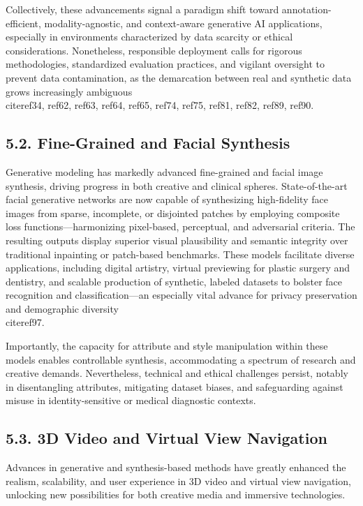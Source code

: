 \documentclass[11pt]{article}
\begin{document}
Collectively, these advancements signal a paradigm shift toward annotation-efficient, modality-agnostic, and context-aware generative AI applications, especially in environments characterized by data scarcity or ethical considerations. Nonetheless, responsible deployment calls for rigorous methodologies, standardized evaluation practices, and vigilant oversight to prevent data contamination, as the demarcation between real and synthetic data grows increasingly ambiguous~\\cite{ref34, ref62, ref63, ref64, ref65, ref74, ref75, ref81, ref82, ref89, ref90}.

\subsection{5.2. Fine-Grained and Facial Synthesis}

Generative modeling has markedly advanced fine-grained and facial image synthesis, driving progress in both creative and clinical spheres. State-of-the-art facial generative networks are now capable of synthesizing high-fidelity face images from sparse, incomplete, or disjointed patches by employing composite loss functions—harmonizing pixel-based, perceptual, and adversarial criteria. The resulting outputs display superior visual plausibility and semantic integrity over traditional inpainting or patch-based benchmarks. These models facilitate diverse applications, including digital artistry, virtual previewing for plastic surgery and dentistry, and scalable production of synthetic, labeled datasets to bolster face recognition and classification—an especially vital advance for privacy preservation and demographic diversity~\\cite{ref97}.

Importantly, the capacity for attribute and style manipulation within these models enables controllable synthesis, accommodating a spectrum of research and creative demands. Nevertheless, technical and ethical challenges persist, notably in disentangling attributes, mitigating dataset biases, and safeguarding against misuse in identity-sensitive or medical diagnostic contexts.

\subsection{5.3. 3D Video and Virtual View Navigation}

Advances in generative and synthesis-based methods have greatly enhanced the realism, scalability, and user experience in 3D video and virtual view navigation, unlocking new possibilities for both creative media and immersive technologies.
\end{document}
